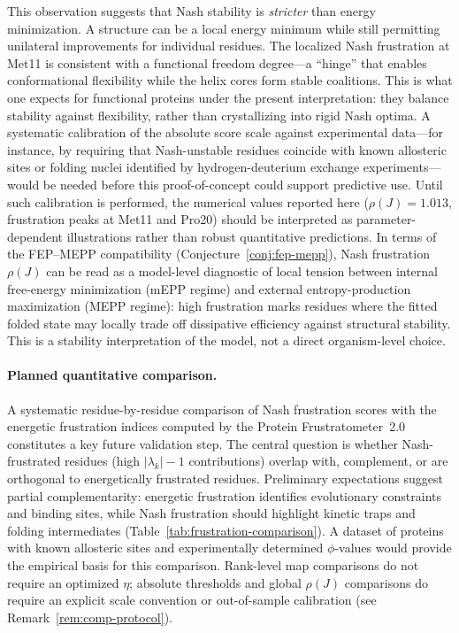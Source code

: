 \documentclass[12pt,a4paper]{article}
\theoremstyle{remark}
\begin{document}
This observation suggests that Nash stability is \textit{stricter} than energy minimization. A structure can be a local energy minimum while still permitting unilateral improvements for individual residues. The localized Nash frustration at Met11 is consistent with a functional freedom degree---a ``hinge'' that enables conformational flexibility while the helix cores form stable coalitions. This is what one expects for functional proteins under the present interpretation: they balance stability against flexibility, rather than crystallizing into rigid Nash optima. A systematic calibration of the absolute score scale against experimental data---for instance, by requiring that Nash-unstable residues coincide with known allosteric sites or folding nuclei identified by hydrogen-deuterium exchange experiments---would be needed before this proof-of-concept could support predictive use. Until such calibration is performed, the numerical values reported here ($\rho(J) = 1.013$, frustration peaks at Met11 and Pro20) should be interpreted as parameter-dependent illustrations rather than robust quantitative predictions.
In terms of the FEP--MEPP compatibility (Conjecture~\ref{conj:fep-mepp}), Nash frustration $\rho(J)$ can be read as a model-level diagnostic of local tension between internal free-energy minimization (mEPP regime) and external entropy-production maximization (MEPP regime): high frustration marks residues where the fitted folded state may locally trade off dissipative efficiency against structural stability. This is a stability interpretation of the model, not a direct organism-level choice.

\paragraph{Planned quantitative comparison.}
A systematic residue-by-residue comparison of Nash frustration scores with the energetic frustration indices computed by the Protein Frustratometer~2.0~\cite{ParraFerreiro2016} constitutes a key future validation step. The central question is whether Nash-frustrated residues (high $|\lambda_k|-1$ contributions) overlap with, complement, or are orthogonal to energetically frustrated residues. Preliminary expectations suggest partial complementarity: energetic frustration identifies evolutionary constraints and binding sites, while Nash frustration should highlight kinetic traps and folding intermediates (Table~\ref{tab:frustration-comparison}). A dataset of proteins with known allosteric sites and experimentally determined $\phi$-values would provide the empirical basis for this comparison. Rank-level map comparisons do not require an optimized $\eta$; absolute thresholds and global $\rho(J)$ comparisons do require an explicit scale convention or out-of-sample calibration (see Remark~\ref{rem:comp-protocol}).
\end{document}

